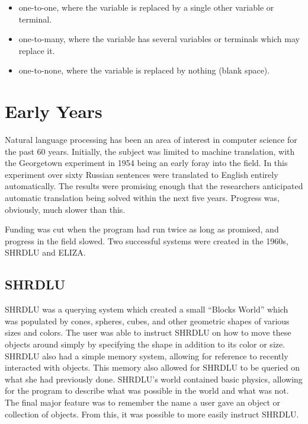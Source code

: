 \begin{itemize}
	\item one-to-one, where the variable is replaced by a single other variable or terminal.
	\item one-to-many, where the variable has several variables or terminals which may replace it.
	\item one-to-none, where the variable is replaced by nothing (blank space).
\end{itemize}



\section{Early Years}

Natural language processing has been an area of interest in computer science for the past 60 years. Initially, the subject was limited to machine translation, with the Georgetown experiment in 1954 being an early foray into the field. In this experiment over sixty Russian sentences were translated to English entirely automatically. The results were promising enough that the researchers anticipated automatic translation being solved within the next five years. \cite{Hutchins} Progress was, obviously, much slower than this.             

 
Funding was cut when the program had run twice as long as promised, and progress in the field slowed. Two successful systems were created in the 1960s, SHRDLU and ELIZA.
                                                                                          
\subsection{SHRDLU}                                                                    
SHRDLU was a querying system which created a small ``Blocks World'' which was populated by cones, spheres, cubes, and other geometric shapes of various sizes and colors. \cite{winograd} The user was able to instruct SHRDLU on how to move these objects around simply by specifying the shape in addition to its color or size. SHRDLU also had a simple memory system, allowing for reference to recently interacted with objects. This memory also allowed for SHRDLU to be queried on what she had previously done. SHRDLU's world contained basic physics, allowing for the program to describe what was possible in the world and what was not. The final major feature was to remember the name a user gave an object or collection of objects. From this, it was possible to more easily instruct SHRDLU.                      
                                                                                          
